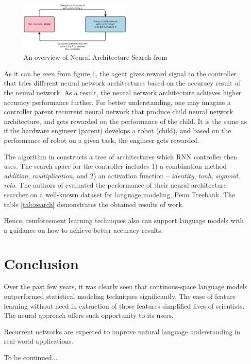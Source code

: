 \documentclass{IEEEtran}
\begin{document}
\begin{figure}[h]
	\centering
	\includegraphics[width=0.5\textwidth]{reinforcement}
	\caption{An overview of Neural Architecture Search from \cite{Quoc2017Reinforcement}}
	\label{fig:rl}
\end{figure}

As it can be seen from figure \ref{fig:rl}, the agent gives reward signal to the controller that tries different neural network architectures based on the accuracy result of the neural network. As a result, the neural network architecture achieves higher accuracy performance further. For better understanding, one may imagine a controller parent recurrent neural network that produce child neural network architecture, and gets rewarded on the performance of the child. It is the same as if the hardware engineer (parent) develops a robot (child), and based on the performance of robot on a given task, the engineer gets rewarded.

The algorithm in \cite{Quoc2017Reinforcement} constructs a tree of architectures which RNN controller then uses. The search space for the controller includes 1) a combination method -- \textit{addition}, \textit{multiplication}, and 2) an activation function -- \textit{identity}, \textit{tanh}, \textit{sigmoid}, \textit{relu}. The authors of \cite{Quoc2017Reinforcement} evaluated the performance of their neural architecture searcher on a well-known dataset for language modeling, Penn Treebank. The table \ref{tab:search} demonstrates the obtained results of \cite{Quoc2017Reinforcement} work.

Hence, reinforcement learning techniques also can support language models with a guidance on how to achieve better accuracy results.

\section{Conclusion}

Over the past few years, it was clearly seen that continous-space language models outperformed statistical modeling techniques significantly. The ease of feature learning without need in extraction of those features simplified lives of scientists. The neural approach offers such opportunity to its users.

Recurrent networks are expected to improve natural language understanding in real-world applications.

To be continued...




\printbibliography
\end{document}

